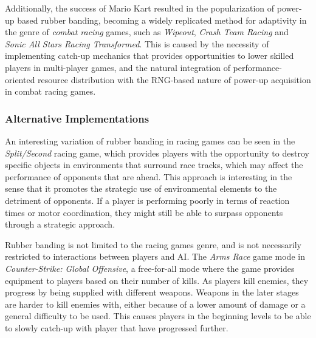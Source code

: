 Additionally, the success of Mario Kart resulted in the popularization of power-up based rubber banding, becoming a widely replicated method for adaptivity in the genre of \emph{combat racing} games, such as \emph{Wipeout}, \emph{Crash Team Racing} and \emph{Sonic All Stars Racing Transformed}. This is caused by the necessity of implementing catch-up mechanics that provides opportunities to lower skilled players in multi-player games, and the natural integration of performance-oriented resource distribution with the RNG-based nature of power-up acquisition in combat racing games.  


\subsubsection{Alternative Implementations}
\label{sec:alternative-rubber-banding}

An interesting variation of rubber banding in racing games can be seen in the \emph{Split/Second} racing game, which provides players with the opportunity to destroy specific objects in environments that surround race tracks, which may affect the performance of opponents that are ahead. This approach is interesting in the sense that it promotes the strategic use of environmental elements to the detriment of opponents. If a player is performing poorly in terms of reaction times or motor coordination, they might still be able to surpass opponents through a strategic approach.

Rubber banding is not limited to the racing games genre, and is not necessarily restricted to interactions between players and AI. The \emph{Arms Race} game mode in \emph{Counter-Strike: Global Offensive}, a free-for-all mode where the game provides equipment to players based on their number of kills. As players kill enemies, they progress by being supplied with different weapons. Weapons in the later stages are harder to kill enemies with, either because of a lower amount of damage or a general difficulty to be used. This causes players in the beginning levels to be able to slowly catch-up with player that have progressed further.

